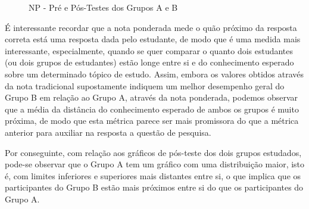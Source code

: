\begin{figure}[htb]
	\centering
	\captionsetup{justification=centering}
	\caption{NP - Pré e Pós-Testes dos Grupos A e B}
	\label{fig:F1_NP_H02}
\end{figure}

É interessante recordar que a nota ponderada mede o quão próximo da resposta correta está uma resposta dada pelo estudante, de modo que é uma medida mais interessante, especialmente, quando se quer comparar o quanto dois estudantes (ou dois grupos de estudantes) estão longe entre si e do conhecimento esperado sobre um determinado tópico de estudo. Assim, embora os valores obtidos através da nota tradicional supostamente indiquem um melhor desempenho geral do Grupo B em relação ao Grupo A, através da nota ponderada, podemos observar que a média da distância do conhecimento esperado de ambos os grupos é muito próxima, de modo que esta métrica parece ser mais promissora do que a métrica anterior para auxiliar na resposta a questão de pesquisa.

Por conseguinte, com relação aos gráficos de pós-teste dos dois grupos estudados, pode-se observar que o Grupo A tem um gráfico com uma distribuição maior, isto é, com limites inferiores e superiores mais distantes entre si, o que implica que os participantes do Grupo B estão mais próximos entre si do que os participantes do Grupo A.

